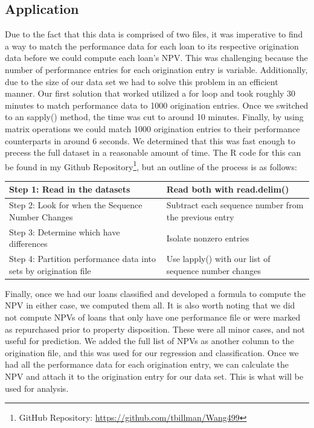 \documentclass[12 pt]{uncw_thesis}
\theoremstyle{plain}
\theoremstyle{remark}
\theoremstyle{definition}
\begin{document}
\subsection{Application}
Due to the fact that this data is comprised of two files, it was imperative to find a way to match the performance data for each loan to its respective origination data before we could compute each loan's NPV. This was challenging because the number of performance entries for each origination entry is variable. Additionally, due to the size of our data set we had to solve this problem in an efficient manner. Our first solution that worked utilized a for loop and took roughly 30 minutes to match performance data to 1000 origination entries. Once we switched to an sapply() method, the time was cut to around 10 minutes. Finally, by using matrix operations we could match 1000 origination entries to their performance counterparts in around 6 seconds. We determined that this was fast enough to precess the full dataset in a reasonable amount of time. The R code for this can be found in my Github Repository\footnote{GitHub Repository: \href{https://github.com/tbillman/Wang499}{https://github.com/tbillman/Wang499}}, but an outline of the process is as follows:
\begin{center}
	\begin{tabular}{|M{6cm}|M{8cm}|} 
		\hline
		Step 1: Read in the datasets & Read both with read.delim()\\ 
		\hline
		Step 2: Look for when the Sequence Number Changes& Subtract each sequence number from the previous entry\\
		\hline
		Step 3: Determine which have differences & Isolate nonzero entries \\
		\hline
		Step 4: Partition performance data into sets by origination file & Use lapply() with our list of sequence number changes\\
		\hline
	\end{tabular}
\end{center}
Finally, once we had our loans classified and developed a formula to compute the NPV in either case, we computed them all. It is also worth noting that we did not compute NPVs of loans that only have one performance file or were marked as repurchased prior to property disposition. These were all minor cases, and not useful for prediction. We added the full list of NPVs as another column to the origination file, and this was used for our regression and classification. 
Once we had all the performance data for each origination entry, we can calculate the NPV and attach it to the origination entry for our data set. This is what will be used for analysis.
\end{document}
